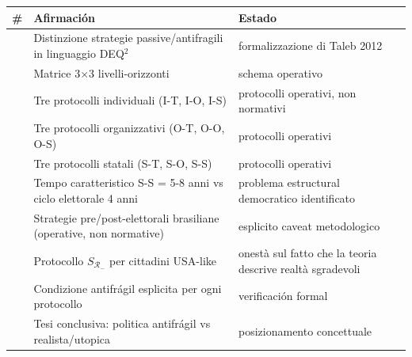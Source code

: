 {\def\LTcaptype{none} %
{\small\begin{longtable}[]{@{}
  >{\raggedright\arraybackslash}p{}
  >{\raggedright\arraybackslash}p{}
  >{\raggedright\arraybackslash}p{}@{}}
\toprule\noalign{}
\begin{minipage}[b]{\linewidth}\raggedright
\#
\end{minipage} & \begin{minipage}[b]{\linewidth}\raggedright
Afirmación
\end{minipage} & \begin{minipage}[b]{\linewidth}\raggedright
Estado
\end{minipage} \\
\midrule\noalign{}
\endhead
\bottomrule\noalign{}
\endlastfoot
1 & Distinzione strategie passive/antifragili in linguaggio DEQ$^2$ &
\Hypoth{} formalizzazione di Taleb 2012 \\
2 & Matrice 3$\times$3 livelli-orizzonti & \Hypoth{} schema operativo \\
3 & Tre protocolli individuali (I-T, I-O, I-S) & \Hypoth{} protocolli
operativi, non normativi \\
4 & Tre protocolli organizzativi (O-T, O-O, O-S) & \Hypoth{} protocolli
operativi \\
5 & Tre protocolli statali (S-T, S-O, S-S) & \Hypoth{} protocolli
operativi \\
6 & Tempo caratteristico S-S = 5-8 anni vs ciclo elettorale 4 anni &
\Hypoth{} problema estructural democratico identificato \\
7 & Strategie pre/post-elettorali brasiliane (operative, non normative)
& \Hypoth{} esplicito caveat metodologico \\
8 & Protocollo \(S_{\mathcal{R}_-}\) per cittadini USA-like & \Hypoth{}
onestà sul fatto che la teoria descrive realtà sgradevoli \\
9 & Condizione antifrágil esplicita per ogni protocollo & \Hypoth{}
verificación formal \\
10 & Tesi conclusiva: politica antifrágil vs realista/utopica &
\Hypoth{} posizionamento concettuale \\
\end{longtable}}
}


